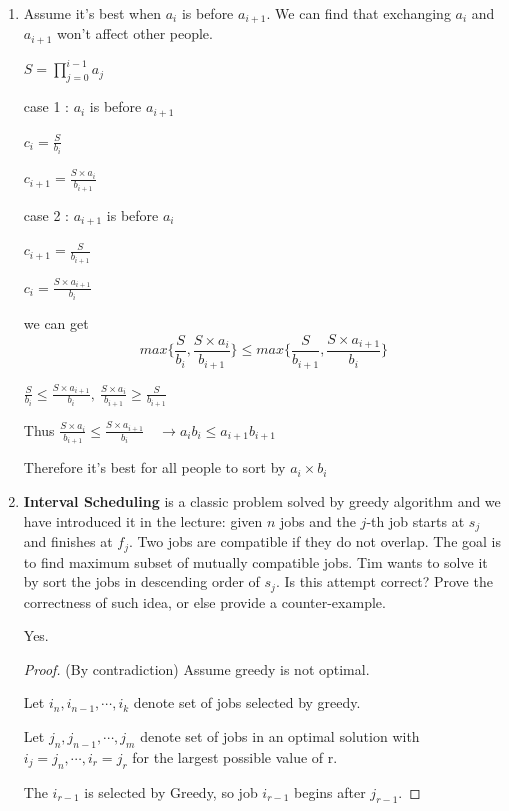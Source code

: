 \documentclass[12pt,a4paper]{article}
\makeatletter
\newtheorem*{solution}{Solution}
\theoremstyle{definition}
\renewenvironment{solution}[1][Solution] {\par\pushQED{\qed}\normalfont\topsep6\p@\@plus6\p@\relax\trivlist\item[\hskip\labelsep\bfseries#1\@addpunct{.}]\ignorespaces}{\popQED\endtrivlist\@endpefalse} \makeatother
\makeatother
\begin{document}
\begin{enumerate}
\begin{solution}
        Assume it's best when $a_i$ is before $a_{i+1}$. We can find that exchanging $a_i$ and $a_{i+1}$ won't affect other people.

        $S=\prod_{j=0}^{i-1} a_j$

        case 1 : $a_i$ is before $a_{i+1}$

        $c_i=\frac{S}{b_i}$

        $c_{i+1}=\frac{S\times a_i}{b_{i+1}}$

        case 2 : $a_{i+1}$ is before $a_{i}$

        $c_{i+1}=\frac{S}{b_{i+1}}$

        $c_i=\frac{S\times a_{i+1}}{b_{i}}$

        we can get $$max\{ \frac{S}{b_i},\frac{S\times a_i}{b_{i+1}} \} \le max \{ \frac{S}{b_{i+1}},\frac{S\times a_{i+1}}{b_{i}} \} $$

        $\frac{S}{b_i} \le \frac{S\times a_{i+1}}{b_{i}} , \ \frac{S\times a_i}{b_{i+1}} \ge \frac{S}{b_{i+1}}$
    
        Thus $\frac{S\times a_i}{b_{i+1}} \le \frac{S\times a_{i+1}}{b_{i}}\quad \rightarrow a_ib_i\le a_{i+1}b_{i+1}$
    
        Therefore it's best for all people to sort by $a_i\times b_i$
     \end{solution}

    \item
    \textbf{Interval Scheduling} is a classic problem solved by greedy algorithm and we have introduced it in the lecture: given $n$ jobs and the $j$-th job starts at $s_j$ and finishes at $f_j$. Two jobs are compatible if they do not overlap. The goal is to find maximum subset of mutually compatible jobs. Tim wants to solve it by sort the jobs in descending order of $s_j$. Is this attempt correct? Prove the correctness of such idea, or else provide a counter-example.

    Yes.

    \begin{proof}
        (By contradiction)
       Assume greedy is not optimal.

       Let $i_{n},i_{n-1},\cdots,i_{k}$ denote set of jobs selected by greedy.

       Let $j_n,j_{n-1},\cdots,j_{m}$ denote set of jobs in an optimal solution with $i_j=j_n,\cdots, i_r=j_r$ for the largest possible value of r.

       The $i_{r-1}$ is selected by Greedy, so job $i_{r-1}$ begins after $j_{r-1}$. 


\end{proof}
\end{enumerate}
\end{document}
